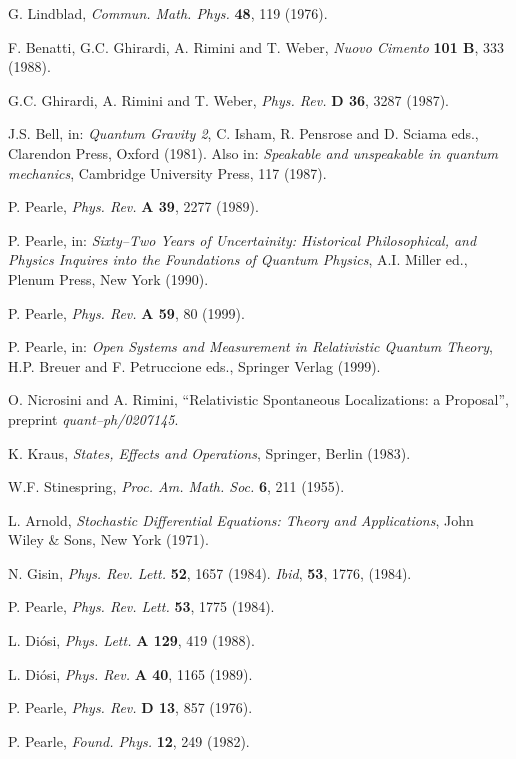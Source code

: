 \documentclass[10pt,a4paper]{article}
\begin{document}
\begin{thebibliography}{999}
 G. Lindblad, {\it Commun. Math. Phys.} {\bf 48}, 119
(1976).

 F. Benatti, G.C. Ghirardi, A. Rimini and T. Weber,
{\it Nuovo Cimento} {\bf 101 B}, 333 (1988).

 G.C. Ghirardi, A. Rimini and T. Weber, {\it Phys.
Rev.} {\bf D 36}, 3287 (1987).

 J.S. Bell, in: {\it Quantum Gravity 2}, C. Isham,
R. Pensrose and D. Sciama eds., Clarendon Press, Oxford (1981).
Also in: {\it Speakable and unspeakable in quantum mechanics},
Cambridge University Press, 117 (1987).

 P. Pearle, {\it Phys. Rev.} {\bf A 39}, 2277
(1989).

 P. Pearle, in: {\it Sixty--Two Years of Uncertainity:
Historical Philosophical, and Physics Inquires into the
Foundations of Quantum Physics}, A.I. Miller ed., Plenum Press,
New York (1990).

 P. Pearle, {\it Phys. Rev.} {\bf A 59}, 80 (1999).

 P. Pearle, in: {\it Open Systems and Measurement in
Relativistic Quantum Theory}, H.P. Breuer and F. Petruccione eds.,
Springer Verlag (1999).

 O. Nicrosini and A. Rimini, ``Relativistic
Spontaneous Localizations: a Proposal'', preprint {\it
quant--ph/0207145}.

 K. Kraus, {\it States, Effects and Operations},
Springer, Berlin (1983).

 W.F. Stinespring, {\it Proc. Am. Math. Soc.} {\bf
6}, 211 (1955).

 L. Arnold, {\it Stochastic Differential Equations:
Theory and Applications}, John Wiley \& Sons, New York (1971).

 N. Gisin, {\it Phys. Rev. Lett.} {\bf 52}, 1657
(1984). {\it Ibid}, {\bf 53}, 1776, (1984).

 P. Pearle, {\it Phys. Rev. Lett.} {\bf 53}, 1775
(1984).

 L. Di\'osi, {\it Phys. Lett.} {\bf A 129}, 419
(1988).

 L. Di\'osi, {\it Phys. Rev.} {\bf A 40}, 1165
(1989).

 P. Pearle, {\it Phys. Rev.} {\bf D 13}, 857 (1976).

 P. Pearle, {\it Found. Phys.} {\bf 12}, 249 (1982).


\end{thebibliography}
\end{document}
